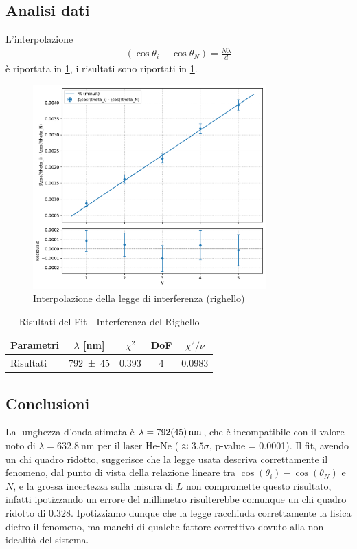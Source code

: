 \documentclass[a4paper]{article}
\begin{document}
\subsection{Analisi dati}
L'interpolazione
\begin{align}
    (\cos\theta_i - \cos\theta_N) = \frac{N\lambda}{d}
\end{align}
è riportata in \cref{fig:interferenza-righello-interpolazione}, i risultati sono riportati in \cref{tab:interferenza-righello-risultati}.

\begin{figure}[htbp]
\centering
\includegraphics[width=0.8\textwidth]{./grafici/righello.pdf}
\caption{Interpolazione della legge di interferenza (righello)}
\label{fig:interferenza-righello-interpolazione}
\end{figure}

\begin{table}[htbp]
\caption{Risultati del Fit - Interferenza del Righello}
\label{tab:interferenza-righello-risultati}
\centering
\begin{tabular}{|l|cccc|}
\hline
Parametri & $\lambda$ [\si{\nano\meter}] & $\chi^2$ & DoF & $\chi^2/\nu$ \\\hline\hline
Risultati & \num{792 \pm 45} & \num{0.393} & 4 & \num{0.0983} \\\hline
\end{tabular}
\end{table}

\subsection{Conclusioni}
La lunghezza d'onda stimata è $\lambda = \SI{792 \pm 45}{\nano\meter}$, che è incompatibile con il valore noto di $\lambda = \SI{632.8}{\nano\meter}$ per il laser He-Ne ($\approx \num{3.5} \sigma$, p-value = \num{0.0001}). Il fit, avendo un chi quadro ridotto, suggerisce che la legge usata descriva correttamente il fenomeno, dal punto di vista della relazione lineare tra $\cos(\theta_i) - \cos(\theta_N)$ e $N$, e la grossa incertezza sulla misura di $L$ non compromette questo risultato, infatti ipotizzando un errore del millimetro risulterebbe comunque un chi quadro ridotto di \num{0.328}. Ipotizziamo dunque che la legge racchiuda correttamente la fisica dietro il fenomeno, ma manchi di qualche fattore correttivo dovuto alla non idealità del sistema. 
\end{document}
